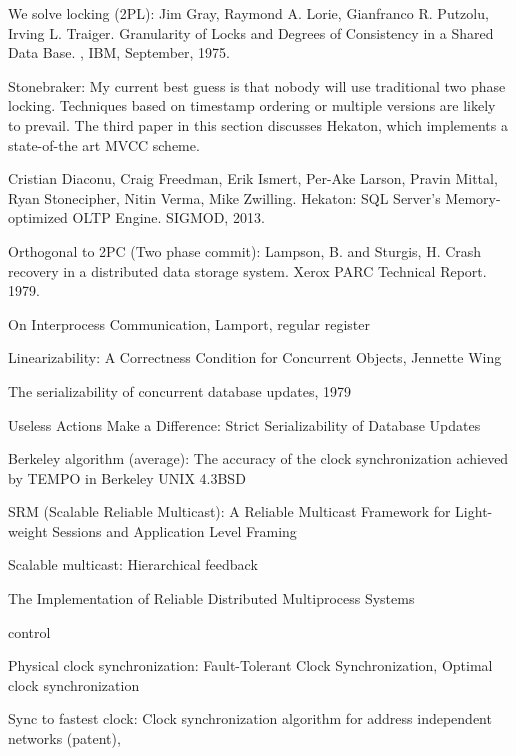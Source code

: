 We solve locking (2PL): Jim Gray, Raymond A. Lorie, Gianfranco R. Putzolu, Irving L. Traiger. Granularity of Locks and Degrees of Consistency in a Shared Data Base. , IBM, September, 1975.

Stonebraker: My current best guess is that nobody will use traditional two phase locking. Techniques based on timestamp ordering or multiple versions are likely to prevail. The third paper in this section discusses Hekaton, which implements a state-of-the art MVCC scheme.

Cristian Diaconu, Craig Freedman, Erik Ismert, Per-Ake Larson, Pravin Mittal, Ryan Stonecipher, Nitin Verma, Mike Zwilling. Hekaton: SQL Server's Memory-optimized OLTP Engine. SIGMOD, 2013.



Orthogonal to 2PC (Two phase commit):
Lampson, B. and Sturgis, H. Crash recovery in a distributed data storage system. Xerox PARC Technical Report. 1979.

On Interprocess Communication, Lamport, regular register

Linearizability: A Correctness Condition for
Concurrent Objects, Jennette Wing

The serializability of concurrent database updates, 1979

Useless Actions Make a Difference:
Strict Serializability of Database Updates

Berkeley algorithm (average):
The accuracy of the clock synchronization achieved by TEMPO in Berkeley UNIX 4.3BSD

SRM (Scalable Reliable Multicast):
A Reliable Multicast Framework for Light-weight Sessions
and Application Level Framing

Scalable multicast:
Hierarchical feedback 

The Implementation of Reliable Distributed Multiprocess Systems

control~\cite{tanenbaum2007distributed}


Physical clock synchronization: Fault-Tolerant Clock Synchronization, 
Optimal clock synchronization

Sync to fastest clock: Clock synchronization algorithm for address independent networks (patent),
\fi
